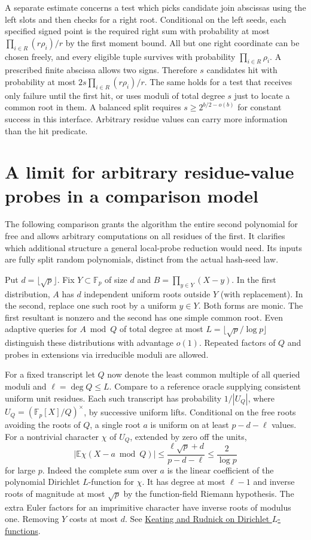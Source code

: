 \documentclass[11pt]{article}
\newcommand{\F}{\mathbb F}
\newcommand{\E}{\mathbb E}
\begin{document}
A separate estimate concerns a test which picks candidate join
abscissas using the left slots and then checks for a right root.
Conditional on the left seeds, each specified signed point is the
required right sum with probability at most
$\prod_{i\in R}(r\rho_i)/r$ by the first moment bound. All but one
right coordinate can be chosen freely, and every eligible tuple survives
with probability $\prod_{i\in R}\rho_i$. A prescribed finite
abscissa allows two signs. Therefore $s$ candidates hit with
probability at most $2s\prod_{i\in R}(r\rho_i)/r$. The same holds
for a test that receives only failure until the first hit, or uses
moduli of total degree $s$ just to locate a common root in them.
A balanced split requires $s\ge 2^{b/2-o(b)}$ for constant success
in this interface. Arbitrary residue values can carry more
information than the hit predicate.

\section{A limit for arbitrary residue-value probes in a comparison model}
The following comparison grants the algorithm the entire second
polynomial for free and allows arbitrary computations on all
residues of the first. It clarifies which additional structure a
general local-probe reduction would need. Its inputs are fully
split random polynomials, distinct from the actual hash-seed law.

Put $d=\lfloor\sqrt p\rfloor$. Fix $Y\subset\F_p$ of size $d$
and $B=\prod_{y\in Y}(X-y)$. In the first distribution, $A$ has
$d$ independent uniform roots outside $Y$ (with replacement).
In the second, replace one such root by a uniform $y\in Y$.
Both forms are monic. The first resultant is nonzero and the
second has one simple common root. Even adaptive queries for
$A\bmod Q$ of total degree at most
$L=\lfloor\sqrt p/\log p\rfloor$ distinguish these distributions
with advantage $o(1)$. Repeated factors of $Q$ and probes in
extensions via irreducible moduli are allowed.

For a fixed transcript let $Q$ now denote the least common multiple
of all queried moduli and $\ell=\deg Q\le L$. Compare to a
reference oracle supplying consistent uniform unit residues. Each
such transcript has probability $1/|U_Q|$, where
$U_Q=(\F_p[X]/Q)^\times$, by successive uniform lifts. Conditional
on the free roots avoiding the roots of $Q$, a single root $a$ is
uniform on at least $p-d-\ell$ values. For a nontrivial character
$\chi$ of $U_Q$, extended by zero off the units,
\[
 \left|\E\chi(X-a\bmod Q)\right|
   \le\frac{\ell\sqrt p+d}{p-d-\ell}\le\frac2{\log p}
\]
for large $p$. Indeed the complete sum over $a$ is the linear
coefficient of the polynomial Dirichlet $L$-function for $\chi$.
It has degree at most $\ell-1$ and inverse roots of magnitude at
most $\sqrt p$ by the function-field Riemann hypothesis. The extra
Euler factors for an imprimitive character have inverse roots of
modulus one. Removing $Y$ costs at most $d$.
See \href{https://www.math.tau.ac.il/~rudnick/papers/KeatingRudnickIMRNfinal.pdf}
{Keating and Rudnick on Dirichlet $L$-functions}.
\end{document}
